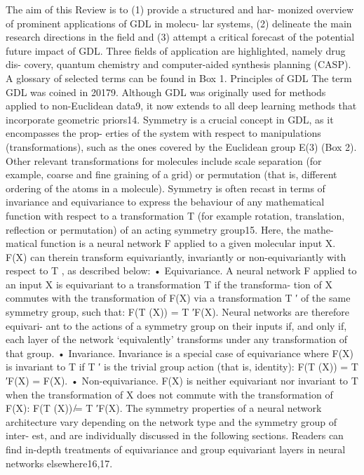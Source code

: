 The aim of this Review is to (1) provide a structured and har-
monized overview of prominent applications of GDL in molecu-
lar systems, (2) delineate the main research directions in the field
and (3) attempt a critical forecast of the potential future impact of
GDL. Three fields of application are highlighted, namely drug dis-
covery, quantum chemistry and computer-aided synthesis planning
(CASP). A glossary of selected terms can be found in Box 1.
Principles of GDL
The term GDL was coined in 20179. Although GDL was originally
used for methods applied to non-Euclidean data9, it now extends
to all deep learning methods that incorporate geometric priors14.
Symmetry is a crucial concept in GDL, as it encompasses the prop-
erties of the system with respect to manipulations (transformations),
such as the ones covered by the Euclidean group E(3) (Box 2). Other
relevant transformations for molecules include scale separation (for
example, coarse and fine graining of a grid) or permutation (that is,
different ordering of the atoms in a molecule).
Symmetry is often recast in terms of invariance and equivariance
to express the behaviour of any mathematical function with respect
to a transformation T  (for example rotation, translation, reflection
or permutation) of an acting symmetry group15. Here, the mathe-
matical function is a neural network F applied to a given molecular
input X. F(X) can therein transform equivariantly, invariantly or
non-equivariantly with respect to T , as described below:
•
Equivariance. A neural network F applied to an input X
is equivariant to a transformation T  if the transforma-
tion of X commutes with the transformation of F(X) via a
transformation T ′ of the same symmetry group, such that:
F(T (X)) = T ′F(X). Neural networks are therefore equivari-
ant to the actions of a symmetry group on their inputs if, and
only if, each layer of the network ‘equivalently’ transforms under
any transformation of that group.
•
Invariance. Invariance is a special case of equivariance where
F(X) is invariant to T  if T ′ is the trivial group action (that is,
identity): F(T (X)) = T ′F(X) = F(X).
•
Non-equivariance. F(X) is neither equivariant nor invariant to
T  when the transformation of X does not commute with the
transformation of F(X): F(T (X)) ̸= T ′F(X).
The symmetry properties of a neural network architecture vary
depending on the network type and the symmetry group of inter-
est, and are individually discussed in the following sections. Readers
can find in-depth treatments of equivariance and group equivariant
layers in neural networks elsewhere16,17.
